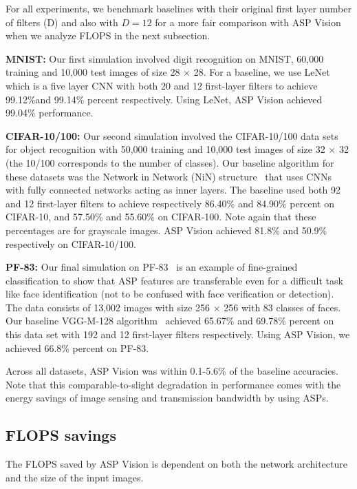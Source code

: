 \documentclass[10pt,twocolumn,letterpaper]{article}
\begin{document}
For all experiments, we benchmark baselines with their original first layer number of filters (D) and also with $D = 12$ for a more fair comparison with ASP Vision when we analyze FLOPS in the next subsection. 

\textbf{MNIST:} Our first simulation involved digit recognition on MNIST, 60,000 training and 10,000 test images of size 28 $\times$ 28. For a baseline, we use LeNet~\cite{LeNet} which is a five layer CNN with both 20 and 12 first-layer filters to achieve 99.12\%and 99.14\% percent respectively. Using LeNet, ASP Vision achieved 99.04\% performance.

\textbf{CIFAR-10/100:} Our second simulation involved the CIFAR-10/100 data sets~\cite{krizhevsky2009learning} for object recognition with 50,000 training and 10,000 test images of size 32 $\times$ 32 (the 10/100 corresponds to the number of classes). Our baseline algorithm for these datasets was the Network in Network (NiN) structure~\cite{NiN} that uses CNNs with fully connected networks acting as inner layers. The baseline used both 92 and 12 first-layer filters to achieve respectively 86.40\% and 84.90\% percent on CIFAR-10, and 57.50\% and 55.60\% on CIFAR-100. Note again that these percentages are for grayscale images. ASP Vision achieved 81.8\% and 50.9\% respectively on CIFAR-10/100.

\textbf{PF-83:} Our final simulation on PF-83~\cite{becker2013evaluating} is an example of fine-grained classification to show that ASP features are transferable even for a difficult task like face identification (not to be confused with face verification or detection). The data consists of 13,002 images with size 256 $\times$ 256 with 83 classes of faces. Our baseline VGG-M-128 algorithm~\cite{VGG} achieved 65.67\% and 69.78\% percent on this data set with 192 and 12 first-layer filters respectively. Using ASP Vision, we achieved 66.8\% percent on PF-83. 

Across all datasets, ASP Vision was within 0.1-5.6\% of the baseline accuracies. Note that this comparable-to-slight degradation in performance comes with the energy savings of image sensing and transmission bandwidth by using ASPs. 

\subsection{FLOPS savings}
The FLOPS saved by ASP Vision is dependent on both the network architecture and the size of the input images. 
\end{document}
